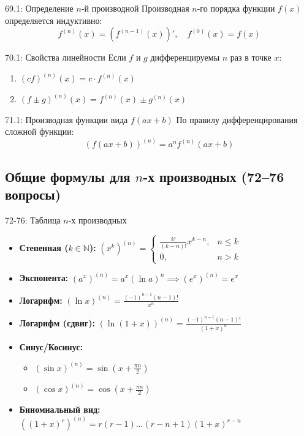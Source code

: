\documentclass[a4paper,12pt]{article}
\begin{document}
	\begin{definitionbox}{69.1: Определение $n$-й производной}
		Производная $n$-го порядка функции $f(x)$ определяется индуктивно:
		$$ f^{(n)}(x) = (f^{(n-1)}(x))', \quad f^{(0)}(x) = f(x) $$
	\end{definitionbox}
	
	\begin{theorembox}{70.1: Свойства линейности}
		Если $f$ и $g$ дифференцируемы $n$ раз в точке $x$:
		\begin{enumerate}
			\item $(cf)^{(n)}(x) = c \cdot f^{(n)}(x)$
			\item $(f \pm g)^{(n)}(x) = f^{(n)}(x) \pm g^{(n)}(x)$
		\end{enumerate}
	\end{theorembox}
	
	\begin{theorembox}{71.1: Производная функции вида $f(ax+b)$}
		По правилу дифференцирования сложной функции:
		$$ (f(ax+b))^{(n)} = a^n f^{(n)}(ax+b) $$
	\end{theorembox}
	
	
	
	
	
	
	
	
	\subsection{Общие формулы для $n$-х производных (72--76 вопросы)}
	
	\begin{theorembox}{{72-76: Таблица $n$-х производных}}
		\begin{itemize}
			\item \textbf{Степенная ($k \in \mathbb{N}$):} $(x^k)^{(n)} = \begin{cases} \frac{k!}{(k-n)!}x^{k-n}, & n \le k \\ 0, & n > k \end{cases}$
			\item \textbf{Экспонента:} $(a^x)^{(n)} = a^x (\ln a)^n \implies (e^x)^{(n)} = e^x$
			\item \textbf{Логарифм:} $(\ln x)^{(n)} = \frac{(-1)^{n-1}(n-1)!}{x^n}$
			\item \textbf{Логарифм (сдвиг):} $(\ln(1+x))^{(n)} = \frac{(-1)^{n-1}(n-1)!}{(1+x)^n}$
			\item \textbf{Синус/Косинус:} 
			\begin{itemize}
				\item $(\sin x)^{(n)} = \sin(x + \frac{\pi n}{2})$
				\item $(\cos x)^{(n)} = \cos(x + \frac{\pi n}{2})$
			\end{itemize}
			\item \textbf{Биномиальный вид:} $((1+x)^r)^{(n)} = r(r-1)\dots(r-n+1)(1+x)^{r-n}$
		\end{itemize}
	\end{theorembox}
	
\end{document}
